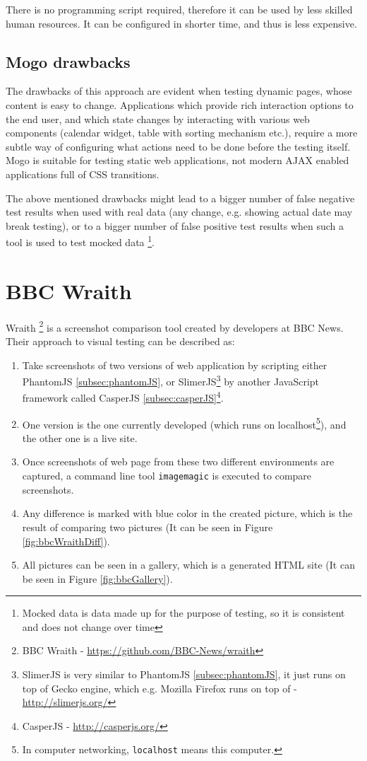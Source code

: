 \documentclass[11pt,oneside,final]{fithesis2}
\begin{document}
  There is no programming script required, therefore it can be used by less skilled human resources. It can be configured in shorter time, and thus is less expensive.
  
  \subsection{Mogo drawbacks}
  
  The drawbacks of this approach are evident when testing dynamic pages, whose content is easy to change. Applications which provide rich interaction options to the end user, and which state
  changes by interacting with various web components (calendar widget, table with sorting mechanism etc.), require a more subtle way of configuring what actions need to be done before the
  testing itself. Mogo is suitable for testing static web applications, not modern AJAX enabled applications full of CSS transitions.
  
  The above mentioned drawbacks might lead to a bigger number of false negative test results when used with real data (any change, e.g. showing actual date may break testing), or to a bigger 
  number of false positive test results when such a tool is used to test mocked data \footnote{Mocked data is data made up for the purpose of testing, so it is consistent and does not 
  change over time}.
  
  \section{BBC Wraith}
  Wraith \footnote{BBC Wraith - \url{https://github.com/BBC-News/wraith}} is a screenshot comparison tool created by developers at BBC News. Their approach to visual testing can be described as:
  \begin{enumerate}
   \item Take screenshots of two versions of web application by scripting either PhantomJS \ref{subsec:phantomJS}, or SlimerJS\footnote{SlimerJS is 
   very similar to PhantomJS \ref{subsec:phantomJS}, it just runs on top of Gecko engine, which e.g. Mozilla Firefox runs on top of - \url{http://slimerjs.org/}} by another JavaScript 
   framework called CasperJS \ref{subsec:casperJS}\footnote{CasperJS - \url{http://casperjs.org/}}.
   \item One version is the one currently developed (which runs on localhost\footnote{In computer networking, \texttt{localhost} means this computer.}), and the other one is a live site.
   \item Once screenshots of web page from these two different environments are captured, a command line tool \texttt{imagemagic} is executed to compare screenshots.
   \item Any difference is marked with blue color in the created picture, which is the result of comparing two pictures (It can be seen in Figure \ref{fig:bbcWraithDiff}).
   \item All pictures can be seen in a gallery, which is a generated HTML site (It can be seen in Figure \ref{fig:bbcGallery}).
  \end{enumerate}
  
\end{document}
